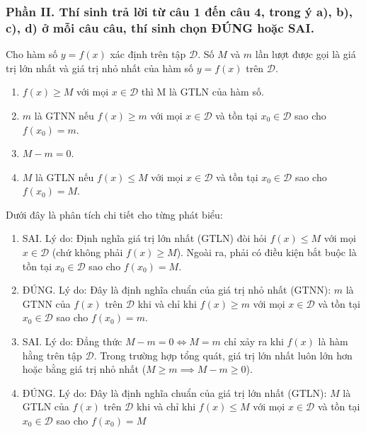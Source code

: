 \subsubsection*{Phần II. Thí sinh trả lời từ câu 1 đến câu 4, trong ý a), b), c), d) ở mỗi câu câu, thí sinh chọn ĐÚNG hoặc SAI.}
\setcounter{bt}{0}
\begin{baitap}
	Cho hàm số $y=f(x)$ xác định trên tập $\mathscr{D}$. Số $M$ và $m$ lần lượt được gọi là giá trị lớn nhất và giá trị nhỏ nhất của hàm số $y=f(x)$ trên $\mathscr{D}$.
	\begin{enumerate}
		\item $f(x) \ge M$ với mọi $x \in \mathscr{D}$ thì M là GTLN của hàm số.
		\item $m$ là GTNN nếu $f(x) \ge m$ với mọi $x \in \mathscr{D}$ và tồn tại $x_0 \in \mathscr{D}$ sao cho $f(x_0) = m$.
		\item $M - m = 0$.
		\item $M$ là GTLN nếu $f(x) \le M$ với mọi $x \in \mathscr{D}$ và tồn tại $x_0 \in \mathscr{D}$ sao cho $f(x_0) = M$.
	\end{enumerate}
	\begin{traloi}
		 Dưới đây là phân tích chi tiết cho từng phát biểu:
		\begin{enumerate}
			\item SAI. Lý do: Định nghĩa giá trị lớn nhất (GTLN) đòi hỏi $f(x) \le M$ với mọi $x \in \mathscr{D}$ (chứ không phải $f(x) \ge M$). Ngoài ra, phải có điều kiện bắt buộc là tồn tại $x_0 \in \mathscr{D}$ sao cho $f(x_0) = M$.
			\item ĐÚNG. Lý do: Đây là định nghĩa chuẩn của giá trị nhỏ nhất (GTNN): $m$ là GTNN của $f(x)$ trên $\mathscr{D}$ khi và chỉ khi $f(x) \ge m$ với mọi $x \in \mathscr{D}$ và tồn tại $x_0 \in \mathscr{D}$ sao cho $f(x_0) = m$.
			\item SAI. Lý do: Đẳng thức $M - m = 0 \iff M = m$ chỉ xảy ra khi $f(x)$ là hàm hằng trên tập $\mathscr{D}$. Trong trường hợp tổng quát, giá trị lớn nhất luôn lớn hơn hoặc bằng giá trị nhỏ nhất ($M \ge m \implies M - m \ge 0$).
			\item ĐÚNG. Lý do: Đây là định nghĩa chuẩn của giá trị lớn nhất (GTLN): $M$ là GTLN của $f(x)$ trên $\mathscr{D}$ khi và chỉ khi $f(x) \le M$ với mọi $x \in \mathscr{D}$ và tồn tại $x_0 \in \mathscr{D}$ sao cho $f(x_0) = M$
		\end{enumerate}
	\end{traloi}
\end{baitap}
